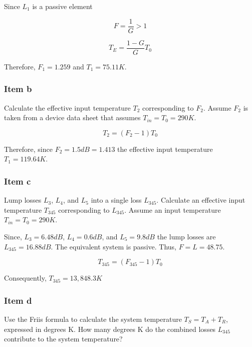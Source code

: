 Since $L_1$ is a passive element

\begin{equation}
	F = \frac{1}{G} > 1
\end{equation}

\begin{equation}
	T_E = \frac{1 - G}{G} T_0
\end{equation}

Therefore, $F_1 = 1.259$ and $T_1 = 75.11 K$.

\subsubsection{Item b}

Calculate the effective input temperature $T_2$ corresponding to $F_2$. Assume
$F_2$ is taken from a device data sheet that assumes $T_{in} = T_0 = 290K$.

\begin{equation}
	T_2 = (F_2 - 1) T_0
\end{equation}

Therefore, since $F_2 = 1.5dB = 1.413$ the effective input temperature
$T_1 = 119.64 K$.

\subsubsection{Item c}

Lump losses $L_3$, $L_4$, and $L_5$ into a single loss $L_{345}$. Calculate an
effective input temperature $T_{345}$ corresponding to $L_{345}$. Assume an
input temperature $T_{in} = T_0 = 290K$.

Since, $L_3 = 6.48 dB$, $L_4 = 0.6 dB$, and $L_5 = 9.8 dB$ the lump losses are
$L_{345} = 16.88 dB$. The equivalent system is passive.
Thus, $F = L = 48.75$.

\begin{equation}
	T_{345} = (F_{345} - 1) T_0
\end{equation}

Consequently, $T_{345} = 13,848.3 K$

\subsubsection{Item d}

Use the Friis formula to calculate the system temperature $T_S = T_A + T_R$,
expressed in degrees K. How many degrees K do the combined losses $L_{345}$
contribute to the system temperature?

